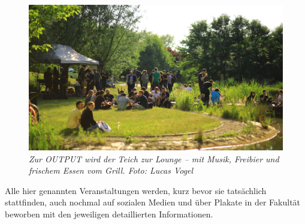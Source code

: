 \begin{figure}[b!]
  \centering
  \includegraphics[width=\linewidth]{img/output_pond}
  \caption*{\small \centering \textit{Zur OUTPUT wird der Teich zur Lounge -- mit Musik, Freibier und frischem Essen vom Grill. Foto: Lucas Vogel}}
\end{figure}



Alle hier genannten Veranstaltungen werden, kurz bevor sie tatsächlich stattfinden, auch nochmal auf sozialen Medien und über Plakate in der Fakultät beworben mit den jeweiligen detaillierten Informationen.

